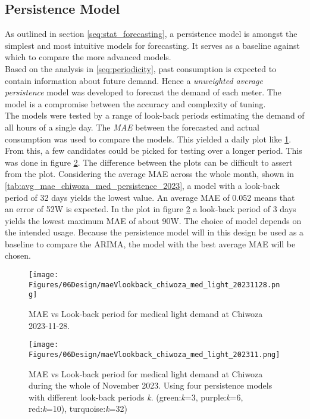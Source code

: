 \subsection{Persistence Model}
As outlined in section \ref{seq:stat_forecasting}, a persistence model is amongst the simplest and most intuitive models for forecasting. It serves as a baseline against which to compare the more advanced models.\\

Based on the analysis in \ref{seq:periodicity}, past consumption is expected to contain information about future demand. Hence a \textit{unweighted average persistence} model was developed to forecast the demand of each meter. The model is a compromise between the accuracy and complexity of tuning.\\

The models were tested by a range of look-back periods estimating the demand of all hours of a single day. The \textit{MAE} between the forecasted and actual consumption was used to compare the models. This yielded a daily plot like \ref{fig:maeVlookback_chiwoza_med_light_20231128}. From this, a few candidates could be picked for testing over a longer period. This was done in figure \ref{fig:maeVlookback_chiwoza_med_light202311}. The difference between the plots can be difficult to assert from the plot. Considering the average MAE across the whole month, shown in \ref{tab:avg_mae_chiwoza_med_persistence_2023}, a model with a look-back period of 32 days yields the lowest value. An average MAE of 0.052 means that an error of 52W is expected. In the plot in figure \ref{fig:maeVlookback_chiwoza_med_light202311} a look-back period of 3 days yields the lowest maximum MAE of about 90W. The choice of model depends on the intended usage. Because the persistence model will in this design be used as a baseline to compare the ARIMA, the model with the best average MAE will be chosen.  

\begin{figure}[]
    \centering
    \texttt{[image: Figures/06Design/maeVlookback\_chiwoza\_med\_light\_20231128.png]}
    \caption[MAE vs lookback-period Medical Light Chiwoza 20231128]{MAE vs Look-back period for medical light demand at Chiwoza 2023-11-28.}
    \label{fig:maeVlookback_chiwoza_med_light_20231128}
\end{figure}

\begin{figure}[]
    \centering
    \texttt{[image: Figures/06Design/maeVlookback\_chiwoza\_med\_light\_202311.png]}
    \caption[MAE vs look-back Medical light 202311]{MAE vs Look-back period for medical light demand at Chiwoza during the whole of November 2023. Using four persistence models with different look-back periods \textit{k}. (green:\textit{k}=3, purple:\textit{k}=6, red:\textit{k}=10), turquoise:\textit{k}=32)}
    \label{fig:maeVlookback_chiwoza_med_light202311}
\end{figure}

